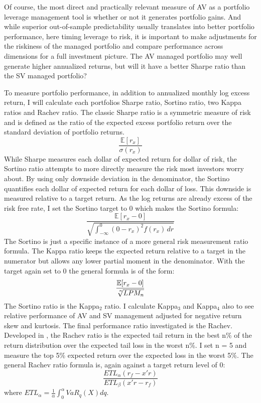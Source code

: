 Of course, the most direct and practically relevant measure of AV as a portfolio leverage management tool is whether or not it generates portfolio gains. And while superior out-of-sample predictability usually translates into better portfolio performance, here timing leverage to risk, it is important to make adjustments for the riskiness of the managed portfolio and compare performance across dimensions for a full investment picture. The AV managed portfolio may well generate higher annualized returns, but will it have a better Sharpe ratio than the SV managed portfolio?

To measure portfolio performance, in addition to annualized monthly log excess return, I will calculate each portfolios Sharpe ratio, Sortino ratio, two Kappa ratios and Rachev ratio. The classic Sharpe ratio is a symmetric measure of risk and is defined as the ratio of the expected excess portfolio return over the standard deviation of portfolio returns.
\begin{equation}
	\frac{\mathbb{E}[r_{x}]}{\sigma(r_{x})}
\end{equation}
While Sharpe measures each dollar of expected return for dollar of risk, the Sortino ratio attempts to more directly measure the risk most investors worry about. By using only downside deviation in the denominator, the Sortino quantifies each dollar of expected return for each dollar of loss. This downside is measured relative to a target return. \citep{sortino_performance_1994} As the log returns are already excess of the risk free rate, I set the Sortino target to 0 which makes the Sortino formula:
\begin{equation}
	\frac{\mathbb{E}[r_{x} - 0]}{\sqrt  {\int _{{-\infty }}^{0}(0-r_{x})^{2}f(r_{x})\,dr}}
\end{equation}
The Sortino is just a specific instance of a more general risk measurement ratio formula. The Kappa ratio keeps the expected return relative to a target in the numerator but allows any lower partial moment in the denominator. \citep{kaplan_kappa:_2004} With the target again set to 0 the general formula is of the form:
\begin{equation}
\frac{\mathbb{E}[r_{x} - 0]}{\sqrt[\leftroot{-2}\uproot{2}n]{LPM_{n}}} 
\end{equation}
The Sortino ratio is the Kappa$_{2}$ ratio. I calculate Kappa$_{3}$ and Kappa$_{4}$ also to see relative performance of AV and SV management adjusted for negative return skew and kurtosis. The final performance ratio investigated is the Rachev. Developed in \citet{biglova_different_2004}, the Rachev ratio is the expected tail return in the best n\% of the return distribution over the expected tail loss in the worst n\%. I set n = 5 and measure the top 5\% expected return over the expected loss in the worst 5\%. The general Rachev ratio formula is, again against a target return level of 0:
\begin{equation}
\frac {ET{L_{\alpha }}\left({{r_{f}}-x'r}\right)}{ET{L_{\beta }}\left({x'r-{r_{f}}}\right)}
\end{equation}
where $ET{L_{\alpha }}={\frac {1}{\alpha }}\int _{0}^{\alpha }{VaR_{q}\left(X\right)dq}$.


